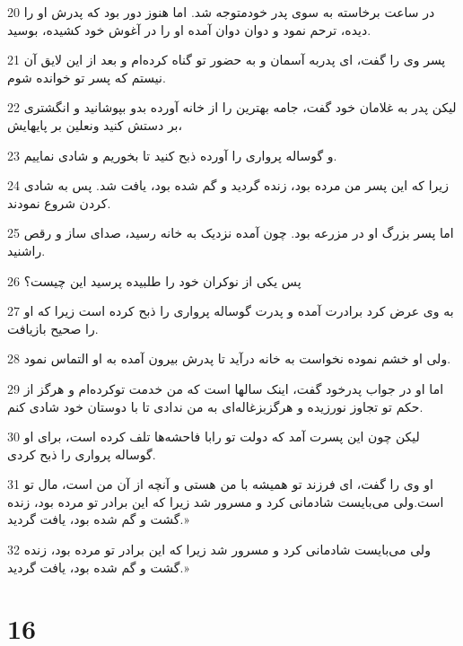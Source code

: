 \par 20 در ساعت برخاسته به سوی پدر خودمتوجه شد. اما هنوز دور بود که پدرش او را دیده، ترحم نمود و دوان دوان آمده او را در آغوش خود کشیده، بوسید.
\par 21 پسر وی را گفت، ای پدربه آسمان و به حضور تو گناه کرده‌ام و بعد از این لایق آن نیستم که پسر تو خوانده شوم.
\par 22 لیکن پدر به غلامان خود گفت، جامه بهترین را از خانه آورده بدو بپوشانید و انگشتری بر دستش کنید ونعلین بر پایهایش،
\par 23 و گوساله پرواری را آورده ذبح کنید تا بخوریم و شادی نماییم.
\par 24 زیرا که این پسر من مرده بود، زنده گردید و گم شده بود، یافت شد. پس به شادی کردن شروع نمودند.
\par 25 اما پسر بزرگ او در مزرعه بود. چون آمده نزدیک به خانه رسید، صدای ساز و رقص راشنید.
\par 26 پس یکی از نوکران خود را طلبیده پرسید این چیست؟
\par 27 به وی عرض کرد برادرت آمده و پدرت گوساله پرواری را ذبح کرده است زیرا که او را صحیح باز‌یافت.
\par 28 ولی او خشم نموده نخواست به خانه درآید تا پدرش بیرون آمده به او التماس نمود.
\par 29 اما او در جواب پدرخود گفت، اینک سالها است که من خدمت توکرده‌ام و هرگز از حکم تو تجاوز نورزیده و هرگزبزغاله‌ای به من ندادی تا با دوستان خود شادی کنم.
\par 30 لیکن چون این پسرت آمد که دولت تو رابا فاحشه‌ها تلف کرده است، برای او گوساله پرواری را ذبح کردی.
\par 31 او وی را گفت، ای فرزند تو همیشه با من هستی و آنچه از آن من است، مال تو است.ولی می‌بایست شادمانی کرد و مسرور شد زیرا که این برادر تو مرده بود، زنده گشت و گم شده بود، یافت گردید.»
\par 32 ولی می‌بایست شادمانی کرد و مسرور شد زیرا که این برادر تو مرده بود، زنده گشت و گم شده بود، یافت گردید.»

\chapter{16}

